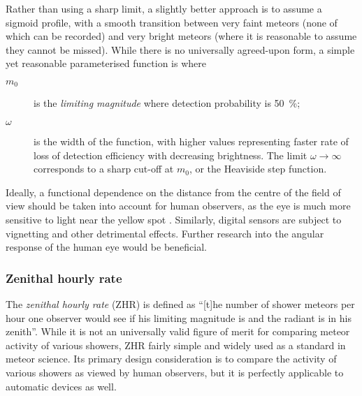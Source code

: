             Rather than using a sharp limit, a slightly better approach is to assume a sigmoid profile,
            with a smooth transition between very faint meteors (none of which can be recorded)
            and very bright meteors (where it is reasonable to assume they cannot be missed).
            While there is no universally agreed-upon form, a simple yet reasonable parameterised function is
            where
            \begin{description}
                \item[$m_0$]    is the \textit{limiting magnitude} where detection probability is \SI{50}{\percent};
                \item[$\omega$] is the width of the function, with higher values representing
                    faster rate of loss of detection efficiency with decreasing brightness.
                    The limit $\omega \to \infty$ corresponds to a sharp cut-off at $m_0$,
                    or the Heaviside step function.
            \end{description}

            Ideally, a functional dependence on the distance from the centre of the field
            of view should be taken into account for human observers, as the eye is much more
            sensitive to light near the yellow spot .
            Similarly, digital sensors are subject to vignetting and other detrimental effects.
            Further research into the angular response of the human eye would be beneficial.

        \subsubsection{Zenithal hourly rate} \label{mspz}
            The \emph{zenithal hourly rate} (ZHR) is defined as ``[t]he number of shower meteors per hour
            one observer would see if his limiting magnitude is  and the radiant is in his zenith''.
            While it is not an universally valid figure of merit for comparing meteor activity of various showers,
            ZHR fairly simple and widely used as a standard in meteor science.
            Its primary design consideration is to compare the activity of various showers as viewed by human observers,
            but it is perfectly applicable to automatic devices as well.

